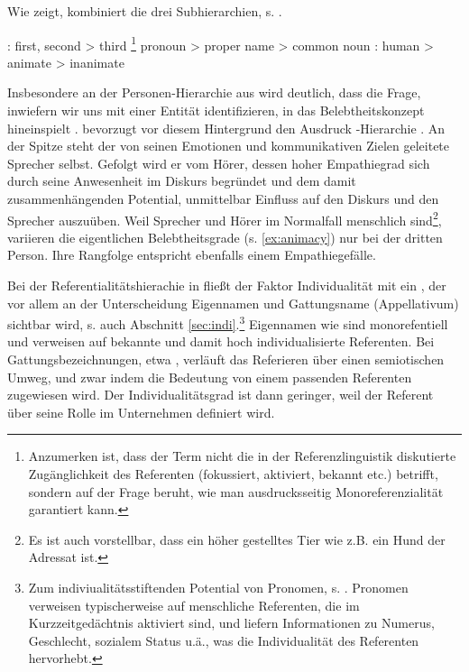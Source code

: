 Wie \textcite[130]{Croft2006} zeigt, kombiniert die  drei Subhierarchien, s. .

\begin{exe}
	\ex \label{ex:croft}
	\begin{xlist}
		\ex \label{ex:person} : first, second > third
		\ex \label{ex:referenz} \footnote{Anzumerken ist, dass der Term   nicht die in der Referenzlinguistik diskutierte Zugänglichkeit des Referenten (fokussiert, aktiviert, bekannt etc.) \parencite[vgl. etwa][]{Gundel1993} betrifft, sondern  auf der Frage beruht, wie man ausdrucksseitig Monoreferenzialität garantiert kann.} pronoun > proper name > common noun
		\ex \label{ex:animacy} : human > animate > inanimate
	\end{xlist}
\end{exe}
\noindent
Insbesondere an der Personen-Hierarchie aus  wird deutlich, dass die Frage, inwiefern wir uns mit einer Entität identifizieren, in das Belebtheitskonzept hineinspielt \parencite[10f. u. 25f.]{Yamamoto1999}. \textcite[307f.]{Langacker1991} bevorzugt vor diesem Hintergrund den Ausdruck -Hierarchie \parencite[ebenso][]{Lehmann2004a}. An der Spitze steht der von seinen Emotionen und kommunikativen Zielen geleitete Sprecher selbst. Gefolgt wird er vom Hörer, dessen hoher Empathiegrad sich durch seine Anwesenheit im Diskurs begründet und dem damit zusammenhängenden Potential, unmittelbar Einfluss auf den Diskurs und den Sprecher auszuüben.  Weil Sprecher und Hörer im Normalfall menschlich sind\footnote{Es ist auch vorstellbar, dass ein höher gestelltes Tier wie z.B. ein Hund der Adressat ist.}, variieren die eigentlichen Belebtheitsgrade (s. \ref{ex:animacy}) nur bei der dritten Person. Ihre Rangfolge entspricht ebenfalls einem Empathiegefälle. 

Bei der Referentialitätshierachie in  fließt der Faktor Individualität mit ein \parencite{Timberlake1977,Hopper1980,Dahl1996,Fraurud1996,Yamamoto1999}, der vor allem an der Unterscheidung Eigennamen und Gattungsname (Appellativum) sichtbar wird, s. auch Abschnitt \ref{sec:indi}.\footnote{Zum indiviualitätsstiftenden Potential von Pronomen, s. \textcite[29ff.]{Yamamoto1999}. Pronomen verweisen typischerweise auf menschliche Referenten, die im Kurzzeitgedächtnis aktiviert sind, und liefern Informationen zu Numerus, Geschlecht, sozialem Status u.ä., was die Individualität des Referenten hervorhebt.} Eigennamen wie  sind monorefentiell und verweisen auf bekannte und damit hoch individualisierte Referenten. Bei Gattungsbezeichnungen, etwa , verläuft das Referieren über einen semiotischen Umweg, und zwar indem die Bedeutung von  einem passenden Referenten zugewiesen wird. Der Individualitätsgrad ist dann geringer, weil der Referent über seine Rolle im Unternehmen definiert wird.

